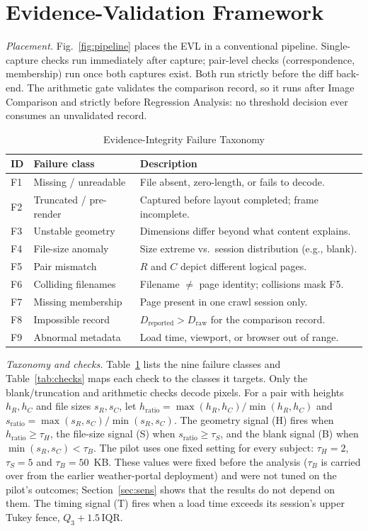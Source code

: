 \documentclass[conference]{IEEEtran}
\newcommand{\Dr}{D_{\mathrm{reported}}}
\newcommand{\Dw}{D_{\mathrm{raw}}}
\begin{document}
\section{Evidence-Validation Framework}\label{sec:framework}
\textit{Placement.} Fig.~\ref{fig:pipeline} places the EVL in a conventional pipeline. Single-capture checks run immediately after capture; pair-level checks (correspondence, membership) run once both captures exist. Both run strictly before the diff back-end. The arithmetic gate validates the comparison record, so it runs after Image Comparison and strictly before Regression Analysis: no threshold decision ever consumes an unvalidated record.

\begin{table}[!t]
\caption{Evidence-Integrity Failure Taxonomy}
\label{tab:taxonomy}
\centering\footnotesize
\begin{tabular}{@{}llp{4.6cm}@{}}
\toprule
ID & Failure class & Description\\
\midrule
F1 & Missing / unreadable & File absent, zero-length, or fails to decode.\\
F2 & Truncated / pre-render & Captured before layout completed; frame incomplete.\\
F3 & Unstable geometry & Dimensions differ beyond what content explains.\\
F4 & File-size anomaly & Size extreme vs.\ session distribution (e.g., blank).\\
F5 & Pair mismatch & $R$ and $C$ depict different logical pages.\\
F6 & Colliding filenames & Filename $\neq$ page identity; collisions mask F5.\\
F7 & Missing membership & Page present in one crawl session only.\\
F8 & Impossible record & $\Dr>\Dw$ for the comparison record.\\
F9 & Abnormal metadata & Load time, viewport, or browser out of range.\\
\bottomrule
\end{tabular}
\end{table}

\textit{Taxonomy and checks.} Table~\ref{tab:taxonomy} lists the nine failure classes and Table~\ref{tab:checks} maps each check to the classes it targets. Only the blank/truncation and arithmetic checks decode pixels. For a pair with heights $h_R,h_C$ and file sizes $s_R,s_C$, let $h_{\mathrm{ratio}}=\max(h_R,h_C)/\min(h_R,h_C)$ and $s_{\mathrm{ratio}}=\max(s_R,s_C)/\min(s_R,s_C)$. The geometry signal (H) fires when $h_{\mathrm{ratio}}\ge\tau_H$, the file-size signal (S) when $s_{\mathrm{ratio}}\ge\tau_S$, and the blank signal (B) when $\min(s_R,s_C)<\tau_B$. The pilot uses one fixed setting for every subject: $\tau_H=2$, $\tau_S=5$ and $\tau_B=50$~KB. These values were fixed before the analysis ($\tau_B$ is carried over from the earlier weather-portal deployment) and were not tuned on the pilot's outcomes; Section~\ref{sec:sens} shows that the results do not depend on them. The timing signal (T) fires when a load time exceeds its session's upper Tukey fence, $Q_3+1.5\,\mathrm{IQR}$.
\end{document}
